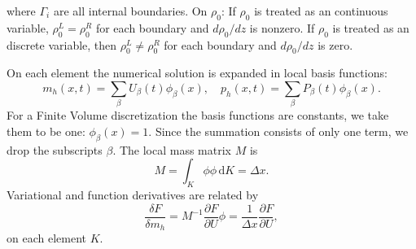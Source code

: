 \documentclass{article}
\begin{document}
where $\Gamma_i$ are all internal boundaries. On $\rho_0$: If $\rho_0$ is treated as an continuous variable, $\rho_0^L = \rho_0^R$ for each boundary and $d \rho_0/d z$ is nonzero. If $\rho_0$ is treated as an discrete variable, then $\rho_0^L \neq \rho_0^R$ for each boundary and $d \rho_0/d z$ is zero.

On each element the numerical solution is expanded in local basis functions:
\begin{equation}
		m_h(x,t) = \sum_\beta U_\beta (t) \phi_\beta(x), \quad
		p_h(x,t) = \sum_\beta P_\beta (t) \phi_\beta(x).
\end{equation}
For a Finite Volume discretization the basis functions are constants, we take them to be one: $\phi_\beta(x) = 1$. Since the summation consists of only one term, we drop the subscripts $\beta$. The local mass matrix $M$ is
\begin{equation}
	M = \int_K \! \phi \phi \, \mathrm{d}K = \Delta x.
\end{equation}
Variational and function derivatives are related by
\begin{equation}
	\frac{\delta F}{\delta m_h} = M^{-1} \frac{\partial F}{\partial U} \phi = \frac{1}{\Delta x} \frac{\partial F}{\partial U},
\end{equation}
on each element $K$. 
\end{document}
